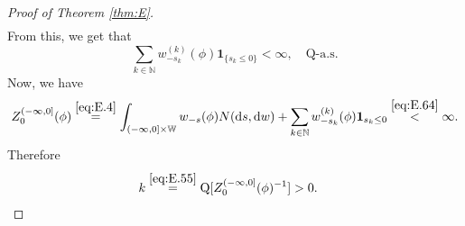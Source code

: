 \documentclass[12pt,a4paper]{amsart}
\numberwithin{equation}{section}
\theoremstyle{plain}
\theoremstyle{definition}
\theoremstyle{remark}
\begin{document}
\begin{proof}[Proof of Theorem \ref{thm:E}]
\begin{align}
\end{align}
	From this, we get that
\begin{equation}
	\sum_{k\in \mathbb N} w^{(k)}_{-s_k}(\phi) \mathbf 1_{\{s_k \leq 0\}}< \infty, \quad \mathrm Q\text{-a.s.}
\end{equation}
	Now, we have
\begin{equation}
	Z_0^{(-\infty, 0]}(\phi) \overset{\eqref{eq:E.4}}= \int_{(-\infty,0]\times \mathbb W}w_{-s}(\phi) N({\mathrm d}s, {\mathrm d}w) + \sum_{k\in \mathbb N} w^{(k)}_{-s_k}(\phi) \mathbf 1_{s_k \leq 0}
	\overset{\eqref{eq:E.64}} < \infty.
\end{equation}
	Therefore
\begin{align}
	& k \overset{\eqref{eq:E.55}}= \mathrm Q[Z^{(-\infty,0]}_0(\phi)^{-1}] > 0.
\end{align}


\end{proof}
\end{document}
